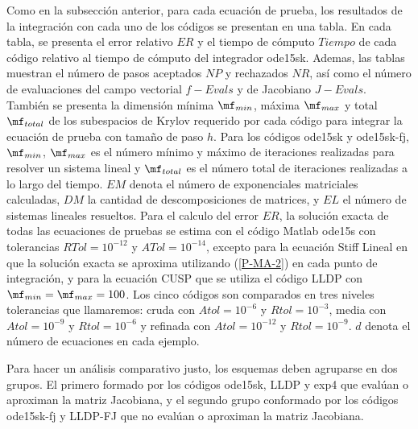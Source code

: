 Como en la subsección anterior, para cada ecuación de prueba, los resultados de la integración con cada uno de los códigos se presentan en una tabla. En cada tabla, se presenta el error relativo $ER$ y el tiempo de cómputo $Tiempo$ de cada código relativo al tiempo de cómputo del integrador ode15sk. Ademas, las tablas muestran el número de pasos aceptados  $NP$ y rechazados $NR$, así como  el número de evaluaciones del campo vectorial $f-Evals$ y de Jacobiano $J-Evals$. También se presenta la dimensión mínima  $\mf_{min}$, máxima $\mf_{max}$ y total $\mf_{total}$ de los subespacios de Krylov requerido por cada código para integrar la ecuación de prueba con tamaño de paso $h$. 
Para los códigos ode15sk y ode15sk-fj, $\mf_{min}$, $\mf_{max}$ es el número mínimo y máximo de iteraciones realizadas
para resolver un sistema lineal y $\mf_{total}$ es el número total de iteraciones realizadas a lo largo del tiempo. $EM$ denota el número de exponenciales matriciales calculadas, $DM$ la cantidad de descomposiciones de matrices, y $EL$ el número de sistemas lineales resueltos. Para el calculo del error $ER$, la  solución exacta de todas las ecuaciones de pruebas se estima con el código Matlab ode15s con tolerancias $RTol=10^{-12}$ y $ATol=10^{-14}$, excepto para la ecuación Stiff Lineal en que la solución exacta se aproxima utilizando (\ref{P-MA-2}) en cada punto de integraci\'on, y para la ecuación CUSP que se utiliza el código LLDP con $\mf_{min}=\mf_{max}=100$. Los cinco códigos son comparados en tres niveles tolerancias que llamaremos: cruda con $Atol=10^{-6}$ y $Rtol=10^{-3}$, media con $Atol=10^{-9}$ y $Rtol=10^{-6}$ y refinada con $Atol=10^{-12}$ y $Rtol=10^{-9}$. $d$ denota el número de ecuaciones en cada ejemplo.

 
Para hacer un análisis comparativo justo, los esquemas deben agruparse en dos grupos. El primero formado por los códigos ode15sk, LLDP y exp4 que evalúan o aproximan la matriz Jacobiana, y el segundo grupo conformado por los códigos ode15sk-fj y LLDP-FJ que no evalúan o aproximan la matriz Jacobiana.

